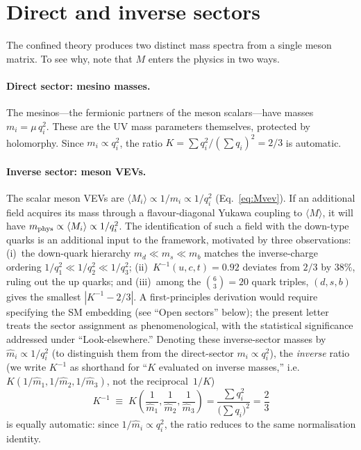 \documentclass[preprint,12pt]{elsarticle}
\begin{document}
\section{Direct and inverse sectors}

The confined theory produces two distinct mass spectra
from a single meson matrix.
To see why, note that $M$ enters the physics in two ways.

\paragraph{Direct sector: mesino masses.}
The mesinos---the fermionic partners of the meson
scalars---have masses $m_i = \mu\,q_i^2$.
These are the UV mass parameters themselves, protected
by holomorphy.
Since $m_i \propto q_i^2$, the ratio
$K = \sum q_i^2/(\sum q_i)^2 = 2/3$ is automatic.

\paragraph{Inverse sector: meson VEVs.}
The scalar meson VEVs are
$\langle M_i \rangle \propto 1/m_i \propto 1/q_i^2$
(Eq.~\ref{eq:Mvev}).
If an additional field acquires its mass through a
flavour-diagonal Yukawa coupling to
$\langle M \rangle$, it will have
$m_{\rm phys} \propto \langle M_i \rangle \propto 1/q_i^2$.
The identification of such a field with the
down-type quarks is an additional input to the
framework, motivated by three observations:
(i)~the down-quark hierarchy
$m_d \ll m_s \ll m_b$ matches
the inverse-charge ordering
$1/q_1^2 \ll 1/q_2^2 \ll 1/q_3^2$;
(ii)~$K^{-1}(u,c,t) = 0.92$
deviates from $2/3$ by $38\%$,
ruling out the up quarks;
and (iii)~among the $\binom{6}{3} = 20$
quark triples, $(d,s,b)$ gives the smallest
$|K^{-1} - 2/3|$.
A first-principles derivation would require
specifying the SM embedding
(see ``Open sectors'' below);
the present letter treats the sector assignment
as phenomenological, with the statistical
significance addressed under ``Look-elsewhere.''
Denoting these inverse-sector masses by
$\hat m_i \propto 1/q_i^2$
(to distinguish them from the direct-sector
$m_i \propto q_i^2$), the \emph{inverse} ratio
(we write $K^{-1}$ as shorthand for
``$K$ evaluated on inverse masses,''
i.e.\ $K(1/\hat m_1,1/\hat m_2,1/\hat m_3)$,
not the reciprocal~$1/K$)
\begin{equation}
  K^{-1} \;\equiv\;
  K\!\left(\frac{1}{\hat m_1},\frac{1}{\hat m_2},
  \frac{1}{\hat m_3}\right)
  = \frac{\sum q_i^2}{\bigl(\sum q_i\bigr)^2}
  = \frac{2}{3}
  \label{eq:Kinv_derived}
\end{equation}
is equally automatic: since
$1/\hat m_i \propto q_i^2$,
the ratio reduces to the same normalisation identity.
\end{document}
